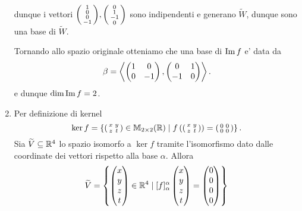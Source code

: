 \begin{solution}
\begin{enumerate}
\begin{gather*}
        \end{gather*}
        dunque i vettori $\begin{psmallmatrix} 1 \\ 0 \\ 0 \\ -1 \end{psmallmatrix}, \begin{psmallmatrix} 0 \\ 1 \\ -1 \\ 0 \end{psmallmatrix}$ sono indipendenti e generano $\widetilde{W}$, dunque sono una base di $\widetilde{W}$.

        Tornando allo spazio originale otteniamo che una base di $\operatorname{Im}f$ e' data da \[
            \beta = \left\langle \begin{pmatrix} 1 & 0 \\ 0 & -1 \end{pmatrix}, \begin{pmatrix} 0 & 1 \\ -1 & 0 \end{pmatrix} \right\rangle.
        \] e dunque $\dim \operatorname{Im}f = 2$.
        \item Per definizione di kernel \[
            \ker f = \left\{ \begin{psmallmatrix}x&y\\z&t \end{psmallmatrix}\in \mathbb{M}_{2\times 2}(\mathbb{R}) \mid f\left(\begin{psmallmatrix}x&y\\z&t \end{psmallmatrix}\right) = \begin{psmallmatrix}0&0\\0&0 \end{psmallmatrix}\right\}.
        \] Sia $\widetilde{V} \subseteq \mathbb{R}^4$ lo spazio isomorfo a $\ker f$ tramite l'isomorfismo dato dalle coordinate dei vettori rispetto alla base $\alpha$. Allora \begin{alignat*}{1}
            \widetilde{V} &= \left\{ \begin{pmatrix}x\\y\\z\\t \end{pmatrix}\in \R^4 \mid [f]^{\alpha}_{\alpha}\begin{pmatrix}x\\y\\z\\t \end{pmatrix} = \begin{pmatrix}0\\0\\0\\0 \end{pmatrix}\right\} \\

\end{alignat*}
\end{enumerate}
\end{solution}
